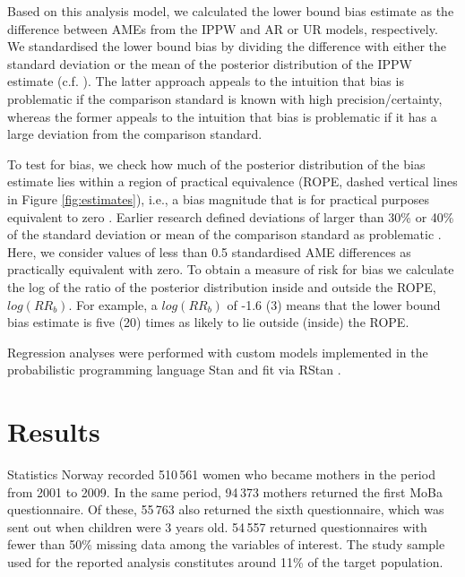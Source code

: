 \documentclass[12pt]{article}
\begin{document}
Based on this analysis model, we calculated the lower bound bias estimate as the difference between AMEs from the IPPW and AR or UR models, respectively. We standardised the lower bound bias by dividing the difference with either the standard deviation or the mean of the posterior distribution of the IPPW estimate (c.f. \cite{Austin2009-xk,Nilsen2009-ci}). The latter approach appeals to the intuition that bias is problematic if the comparison standard is known with high precision/certainty, whereas the former appeals to the intuition that bias is problematic if it has a large deviation from the comparison standard. 

To test for bias, we check how much of the posterior distribution of the bias estimate lies within a region of practical equivalence (ROPE, dashed vertical lines in Figure \ref{fig:estimates}), i.e., a bias magnitude that is for practical purposes equivalent to zero \cite{Mascha2011-um}. Earlier research defined deviations of larger than 30\% or 40\% of the standard deviation or mean of the comparison standard as problematic \cite{Stuart2010-cj,Nohr2006-uf}. Here, we consider values of less than 0.5 standardised AME differences as practically equivalent with zero. To obtain a measure of risk for bias we calculate the log of the ratio of the posterior distribution inside and outside the ROPE, $log(RR_b)$. For example, a $log(RR_b)$ of -1.6 (3) means that the lower bound bias estimate is five (20) times as likely to lie outside (inside) the ROPE.

Regression analyses were performed with custom models implemented in the probabilistic programming language Stan \cite{Stan_Development_Team2017-lp} and fit via RStan \cite{Stan_Development_Team_2018-rs}.

\section{Results}

Statistics Norway recorded 510\,561 women who became mothers in the period from 2001 to 2009. In the same period, 94\,373 mothers returned the first MoBa questionnaire. Of these, 55\,763 also returned the sixth questionnaire,  which was sent out when  children were 3 years old. 54\,557 returned questionnaires with fewer than 50\% missing data among the variables of interest. The study sample used for the reported analysis constitutes around 11\% of the target population.
\end{document}

